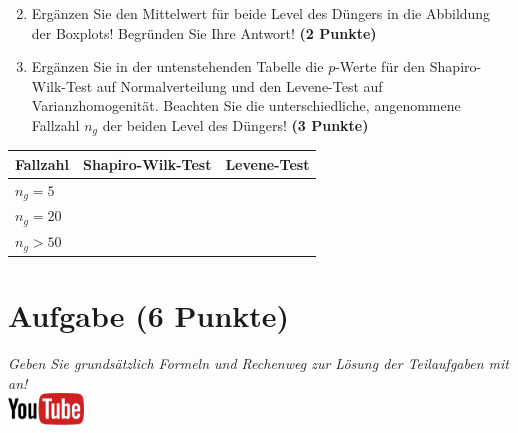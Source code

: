 \documentclass[a4paper, 10pt]{scrartcl}\usepackage[]{graphicx}\usepackage[]{xcolor}
\begin{document}
\begin{enumerate}
  \setcounter{enumi}{1}
\item Erg{\"a}nzen Sie den Mittelwert f{\"u}r beide Level des D{\"u}ngers in die
  Abbildung der Boxplots! Begr{\"u}nden Sie Ihre Antwort! \textbf{(2 Punkte)}
\item Erg{\"a}nzen Sie in der untenstehenden Tabelle die $p$-Werte f{\"u}r den
  Shapiro-Wilk-Test auf Normalverteilung und den Levene-Test auf
  Varianzhomogenit{\"a}t. Beachten Sie die unterschiedliche, angenommene
  Fallzahl $n_g$ der beiden Level des D{\"u}ngers! \textbf{(3 Punkte)}
\end{enumerate}

\begin{center}
  \large
  \begin{tabular}[c]{l|c|c}
  Fallzahl  & Shapiro-Wilk-Test & Levene-Test \strut\\ 
    \hline
    \textbf{$n_g = 5$} & \hspace{4cm} & \hspace{4cm} \strut\\
    \hline
    \textbf{$n_g = 20$} & \hspace{4cm} & \hspace{4cm} \strut\\
    \hline
    \textbf{$n_g > 50$} & \hspace{4cm} & \hspace{4cm} \strut\\
    \hline
  \end{tabular}
\end{center} 
\clearpage

\section{Aufgabe \hfill (6 Punkte)}

\textit{Geben Sie grunds{\"a}tzlich Formeln und Rechenweg zur L{\"o}sung der
  Teilaufgaben mit an!} \\[1Ex]

\hfill\href{https://youtu.be/knAziLLQGb0}{\includegraphics[width =
  2cm]{img/youtube}}\\[1Ex]
\end{document}
